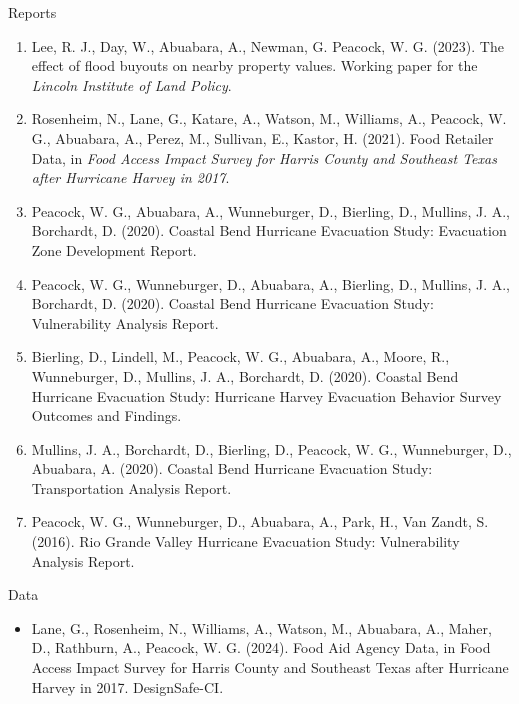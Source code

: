 \documentclass[11pt,oneside]{article}
\begin{document}
{Reports}
\begin{enumerate}[leftmargin=20pt]
\item Lee, R. J., Day, W., Abuabara, A., Newman, G. Peacock, W. G. (2023). The effect of flood buyouts on nearby property values. Working paper for the \emph{Lincoln Institute of Land Policy}.
\item Rosenheim, N., Lane, G., Katare, A., Watson, M., Williams, A., Peacock, W. G., Abuabara, A., Perez, M., Sullivan, E., Kastor, H. (2021). Food Retailer Data, in \emph{Food Access Impact Survey for Harris County and Southeast Texas after Hurricane Harvey in 2017}.
\item Peacock, W. G., Abuabara, A., Wunneburger, D., Bierling, D., Mullins, J. A., Borchardt, D. (2020). Coastal Bend Hurricane Evacuation Study: Evacuation Zone Development Report.
\item Peacock, W. G., Wunneburger, D., Abuabara, A., Bierling, D., Mullins, J. A., Borchardt, D. (2020). Coastal Bend Hurricane Evacuation Study: Vulnerability Analysis Report.
\item Bierling, D., Lindell, M., Peacock, W. G., Abuabara, A., Moore, R., Wunneburger, D., Mullins, J. A., Borchardt, D. (2020). Coastal Bend Hurricane Evacuation Study: Hurricane Harvey Evacuation Behavior Survey Outcomes and Findings.
\item Mullins, J. A., Borchardt, D., Bierling, D., Peacock, W. G., Wunneburger, D., Abuabara, A. (2020). Coastal Bend Hurricane Evacuation Study: Transportation Analysis Report.
\item Peacock, W. G., Wunneburger, D., Abuabara, A., Park, H., Van Zandt, S. (2016). Rio Grande Valley Hurricane Evacuation Study: Vulnerability Analysis Report.
\end{enumerate}

\vspace{3pt}

{Data}
\begin{itemize}[leftmargin=20pt]
\item Lane, G., Rosenheim, N., Williams, A., Watson, M., Abuabara, A., Maher, D., Rathburn, A., Peacock, W. G. (2024). Food Aid Agency Data, in Food Access Impact Survey for Harris County and Southeast Texas after Hurricane Harvey in 2017. DesignSafe-CI.
\end{itemize}

\vspace{3pt}
\end{document}
